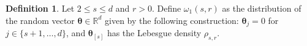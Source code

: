 \documentclass[aos,preprint]{imsart}
\theoremstyle{plain}
\theoremstyle{definition}
\newtheorem{remark}{Remark}
\newtheorem{definition}{Definition}
\newcommand{\btheta}{\boldsymbol{\theta}}
\newcommand{\bd}[1]{\boldsymbol{#1}}
\newcommand{\idf}{\mathbbm{1}}
\newcommand{\bSigma}{\boldsymbol{\Sigma}}
\newcommand{\lmax}[1]{\lambda_{\max}\left(#1\right)}
\newcommand{\mR}{\mathbb{R}}
\newcommand{\mS}{\mathcal{S}}
\newcommand{\bu}{\boldsymbol{u}}
\newcommand{\bR}{\mathbb{R}}
\begin{document}
\begin{appendix}

\begin{definition} \label{def: omega_1}
Let $2 \leq s\leq  d$ and $r > 0$. Define $\omega_1(s,r)$ as the distribution of the random vector $\btheta \in \bR^{d}$  given by the following construction: $\btheta_j = 0$ for $j \in \{s+1,\ldots,d\}$, and $\btheta_{[s]}$ has the Lebesgue density $\rho_{s,r}$.
\end{definition}


\end{appendix}
\end{document}
